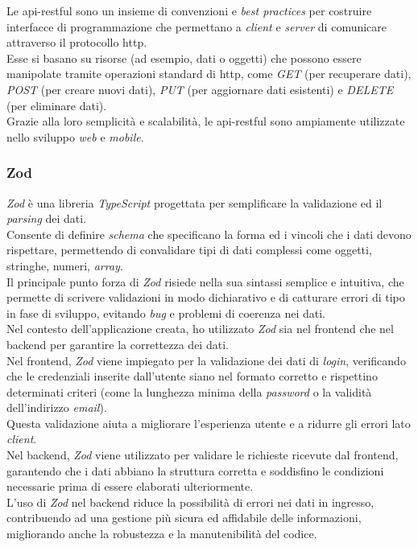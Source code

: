 \noindent Le \gls{api-restful} sono un insieme di convenzioni e \textit{best practices} per costruire interfacce di programmazione che permettano a \textit{client} e \textit{server} di comunicare attraverso il protocollo \gls{http}.\\
Esse si basano su risorse (ad esempio, dati o oggetti) che possono essere manipolate tramite operazioni standard di \gls{http}, come \textit{GET} (per recuperare dati), \textit{POST} (per creare nuovi dati), \textit{PUT} (per aggiornare dati esistenti) e \textit{DELETE} (per eliminare dati).\\
Grazie alla loro semplicità e scalabilità, le \gls{api-restful} sono ampiamente utilizzate nello sviluppo \textit{web} e \textit{mobile}.

\subsubsection{Zod}

\textit{Zod} è una libreria \textit{TypeScript} progettata per semplificare la validazione ed il \textit{parsing} dei dati. \\
Consente di definire \textit{schema} che specificano la forma ed i vincoli che i dati devono rispettare, permettendo di convalidare tipi di dati complessi come oggetti, stringhe, numeri, \textit{array}.\\
Il principale punto forza di \textit{Zod} risiede nella sua sintassi semplice e intuitiva, che permette di scrivere validazioni in modo dichiarativo e di catturare errori di tipo in fase di sviluppo, evitando \textit{bug} e problemi di coerenza nei dati.\\

\noindent Nel contesto dell'applicazione creata, ho utilizzato \textit{Zod} sia nel \gls{frontend} che nel \gls{backend} per garantire la correttezza dei dati.\\
Nel \gls{frontend}, \textit{Zod} viene impiegato per la validazione dei dati di \textit{login}, verificando che le credenziali inserite dall'utente siano nel formato corretto e rispettino determinati criteri (come la lunghezza minima della \textit{password} o la validità dell'indirizzo \textit{email}).\\
Questa validazione aiuta a migliorare l'esperienza utente e a ridurre gli errori lato \textit{client}.\\

\noindent Nel \gls{backend}, \textit{Zod} viene utilizzato per validare le richieste ricevute dal \gls{frontend}, garantendo che i dati abbiano la struttura corretta e soddisfino le condizioni necessarie prima di essere elaborati ulteriormente.\\
L'uso di \textit{Zod} nel \gls{backend} riduce la possibilità di errori nei dati in ingresso, contribuendo ad una gestione più sicura ed affidabile delle informazioni, migliorando anche la robustezza e la manutenibilità del codice.

